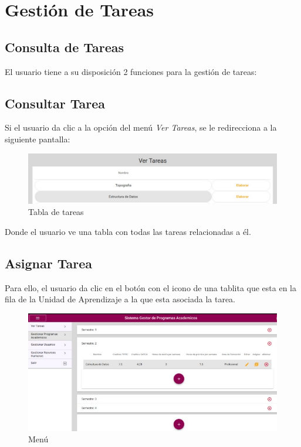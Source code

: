 \section{Gestión de Tareas}
    \subsection{Consulta de Tareas}
        El usuario tiene a su disposición 2 funciones para la gestión de tareas:

        \subsection{Consultar Tarea}

            Si el usuario da clic a la opción del menú \textit{Ver Tareas}, se le redirecciona a la siguiente pantalla:
            \begin{figure}[H]
                \centering
                \hypertarget{asignart}{\includegraphics[width=0.7\linewidth]{images/Tareas/Vertareas}}
                \caption{Tabla de tareas}
                \label{asignart}
            \end{figure}
            Donde el usuario ve una tabla con todas las tareas relacionadas a él.

        \subsection{Asignar Tarea}

            Para ello, el usuario da clic en el botón con el icono de una tablita que esta en la fila de la Unidad de Aprendizaje a la que esta asociada la tarea.


            \begin{figure}[H]
                \centering
                \hypertarget{menu}{\includegraphics[width=0.7\linewidth]{images/Tareas/Menu}}
                \caption{Menú}
                \label{menu}
            \end{figure}



